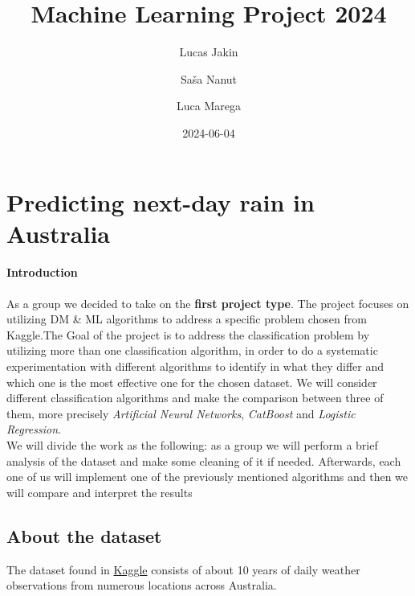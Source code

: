 \documentclass[
  letterpaper,
  DIV=11,
  numbers=noendperiod]{scrartcl}
\title{Machine Learning Project 2024}
\author{Lucas Jakin \and Saša Nanut \and Luca Marega}
\date{2024-06-04}
\let\oldparagraph\paragraph
\renewcommand{\paragraph}[1]{\oldparagraph{#1}\mbox{}}
\renewcommand*\contentsname{Table of contents}
\newcommand\contentsname{Table of contents}
\begin{document}
\maketitle
\ifdefined\Shaded\renewenvironment{Shaded}{\begin{tcolorbox}[breakable, borderline west={3pt}{0pt}{shadecolor}, sharp corners, interior hidden, frame hidden, enhanced, boxrule=0pt]}{\end{tcolorbox}}\fi

\renewcommand*\contentsname{Table of contents}
{
\hypersetup{linkcolor=}
\setcounter{tocdepth}{3}
\tableofcontents
}
\hypertarget{predicting-next-day-rain-in-australia}{%
\section{Predicting next-day rain in
Australia}\label{predicting-next-day-rain-in-australia}}

\hypertarget{introduction}{%
\paragraph{Introduction}\label{introduction}}

As a group we decided to take on the \textbf{first project type}. The
project focuses on utilizing DM \& ML algorithms to address a specific
problem chosen from Kaggle.The Goal of the project is to address the
classification problem by utilizing more than one classification
algorithm, in order to do a systematic experimentation with different
algorithms to identify in what they differ and which one is the most
effective one for the chosen dataset. We will consider different
classification algorithms and make the comparison between three of them,
more precisely \emph{Artificial Neural Networks}, \emph{CatBoost} and
\emph{Logistic Regression}.\\

We will divide the work as the following: as a group we will perform a
brief analysis of the dataset and make some cleaning of it if needed.
Afterwards, each one of us will implement one of the previously
mentioned algorithms and then we will compare and interpret the results

\hypertarget{about-the-dataset}{%
\subsection{About the dataset}\label{about-the-dataset}}

The dataset found in
\href{https://www.kaggle.com/datasets/jsphyg/weather-dataset-rattle-package/code}{Kaggle}
consists of about 10 years of daily weather observations from numerous
locations across Australia.\\
\end{document}
